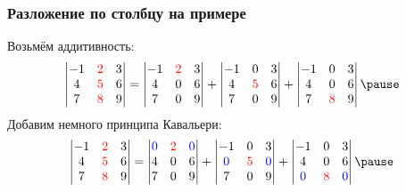 \begin{frame}
    \frametitle{Разложение по столбцу на примере}
    Возьмём аддитивность:
    \[
\begin{vmatrix}
    -1 & \red{2} & 3 \\
    4 & \red{5} & 6 \\
    7 & \red{8} & 9 \\
\end{vmatrix}  =       
\begin{vmatrix}
    -1 & \red{2} & 3 \\
    4 & 0 & 6 \\
    7 & 0 & 9 \\
\end{vmatrix} +
\begin{vmatrix}
    -1 & 0 & 3 \\
    4 & \red{5} & 6 \\
    7 & 0 & 9 \\
\end{vmatrix} +
\begin{vmatrix}
    -1 & 0 & 3 \\
    4 & 0 & 6 \\
    7 & \red{8} & 9 \\
\end{vmatrix} \pause
    \]
    Добавим немного принципа Кавальери:
\[
    \begin{vmatrix}
        -1 & \red{2} & 3 \\
        4 & \red{5} & 6 \\
        7 & \red{8} & 9 \\
    \end{vmatrix}  =       
    \begin{vmatrix}
        \blue{0} & \red{2} & \blue{0} \\
        4 & 0 & 6 \\
        7 & 0 & 9 \\
    \end{vmatrix} +
    \begin{vmatrix}
        -1 & 0 & 3 \\
\blue{0} & \red{5} & \blue{0} \\
        7 & 0 & 9 \\
    \end{vmatrix} +
    \begin{vmatrix}
        -1 & 0 & 3 \\
        4 & 0 & 6 \\
\blue{0} & \red{8} & \blue{0} \\
    \end{vmatrix} \pause
\]
\end{frame}
